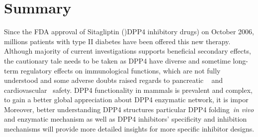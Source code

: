 \section{\label{chap:Sum} Summary}
Since the FDA approval of Sitagliptin ()DPP4 inhibitory drugs) on October 2006, millions patients with type II diabetes have been offered this new therapy. Although majority of current investigations supports beneficial secondary effects, the cautionary tale needs to be taken as DPP4 have diverse and sometime long-term regulatory effects on immunological functions, which are not fully understood and some adverse doubts raised regards to pancreatic ~\cite{Egan2014, Jermendy2016} and cardiovascular~\cite{Scirica2013} safety. DPP4 functionality in mammals is prevalent and complex, to gain a better global appreciation about DPP4 enzymatic network, it is impor  Moreover, better understanding DPP4 structures particular DPP4 folding~\textit{in vivo} and enzymatic mechanism as well as DPP4 inhibitors' specificity and inhibition mechanisms will provide more detailed insights for more specific inhibitor designs. 
